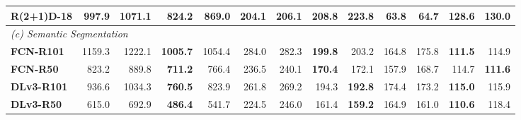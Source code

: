 \begin{table}[t]
{\begin{tabular}{lrrrrrrrrrrrr}
\textbf{R(2+1)D-18} & 997.9 & 1071.1 & \cellcolor{green!15}\textbf{824.2} & 869.0 & \cellcolor{green!15}\textbf{204.1} & 206.1 & 208.8 & 223.8 & \cellcolor{green!15}\textbf{63.8} & 64.7 & 128.6 & 130.0 \\
\midrule
\multicolumn{13}{l}{\textit{(c) Semantic Segmentation}} \\
\midrule
\textbf{FCN-R101} & 1159.3 & 1222.1 & \cellcolor{green!15}\textbf{1005.7} & 1054.4 & 284.0 & 282.3 & \cellcolor{green!15}\textbf{199.8} & 203.2 & 164.8 & 175.8 & \cellcolor{green!15}\textbf{111.5} & 114.9 \\
\textbf{FCN-R50} & 823.2 & 889.8 & \cellcolor{green!15}\textbf{711.2} & 766.4 & 236.5 & 240.1 & \cellcolor{green!15}\textbf{170.4} & 172.1 & 157.9 & 168.7 & 114.7 & \cellcolor{green!15}\textbf{111.6} \\
\textbf{DLv3-R101} & 936.6 & 1034.3 & \cellcolor{green!15}\textbf{760.5} & 823.9 & 261.8 & 269.2 & 194.3 & \cellcolor{green!15}\textbf{192.8} & 174.4 & 173.2 & \cellcolor{green!15}\textbf{115.0} & 115.9 \\
\textbf{DLv3-R50} & 615.0 & 692.9 & \cellcolor{green!15}\textbf{486.4} & 541.7 & 224.5 & 246.0 & 161.4 & \cellcolor{green!15}\textbf{159.2} & 164.9 & 161.0 & \cellcolor{green!15}\textbf{110.6} & 118.4 \\
\bottomrule
\end{tabular}%
}
\end{table}
